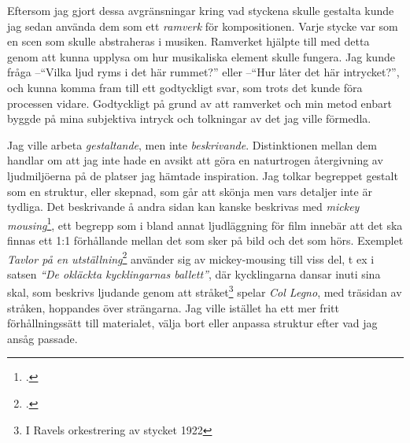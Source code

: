 \documentclass{article}
\begin{document}
Eftersom jag gjort dessa avgränsningar kring vad styckena skulle gestalta kunde jag sedan använda dem som ett
\emph{ramverk} för kompositionen. Varje stycke var som en scen som skulle abstraheras i musiken. Ramverket
hjälpte till med detta genom att kunna upplysa om hur musikaliska element skulle fungera. Jag kunde fråga 
--``Vilka ljud ryms i det här rummet?'' eller --``Hur låter det här intrycket?'', och kunna komma fram
till ett godtyckligt svar, som trots det kunde föra processen vidare. Godtyckligt på grund av att ramverket
och min metod enbart byggde på mina subjektiva intryck och tolkningar av det jag ville förmedla.


Jag ville arbeta \emph{gestaltande}, men inte \emph{beskrivande}. Distinktionen mellan dem handlar om att jag
inte hade en avsikt att göra en naturtrogen återgivning av ljudmiljöerna på de platser jag hämtade
inspiration. Jag tolkar begreppet gestalt som en struktur, eller skepnad, som går att skönja men vars detaljer
inte är tydliga. Det beskrivande å andra sidan kan kanske beskrivas med \emph{mickey
mousing}\footcite{mickeymouse}, ett begrepp som i
bland annat ljudläggning för film innebär att det ska finnas ett 1:1 förhållande mellan det som sker på bild
och det som hörs. Exemplet \emph{Tavlor på en utställning}\footcite{Tavlor} använder sig av mickey-mousing till
viss del, t ex i satsen \emph{``De okläckta kycklingarnas ballett''}, där kycklingarna dansar inuti sina skal,
som beskrivs ljudande genom att stråket\footnote{I Ravels orkestrering av stycket 1922} spelar \emph{Col
Legno}, med träsidan av stråken, hoppandes över strängarna. Jag ville istället ha ett mer fritt
förhållningssätt till materialet, välja bort eller anpassa struktur efter vad jag ansåg passade.
\end{document}
